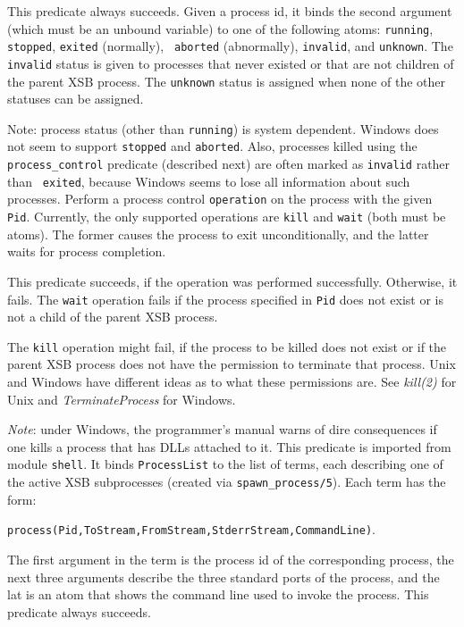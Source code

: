 \begin{description}
    This predicate always succeeds. Given a process id, it binds the second
    argument (which must be an unbound variable) to one of the following
    atoms: {\tt running}, {\tt stopped}, {\tt exited} (normally), {\tt
      aborted} (abnormally), {\tt invalid}, and {\tt unknown}.
    The {\tt invalid} status is given to processes that never existed or
    that are not children of the parent XSB process. The {\tt unknown}
    status is assigned when none of the other statuses can be assigned.

    Note: process status (other than {\tt running}) is system dependent.
    Windows does not seem to support {\tt stopped} and {\tt aborted}.
    Also, processes killed using the \verb|process_control| predicate
    (described next) are often marked as {\tt invalid} rather than {\tt
    exited}, because Windows seems to lose all information about such
    processes.
    Perform a process control {\tt operation} on the process with the given
    {\tt Pid}. 
    Currently, the only supported operations are {\tt kill} and {\tt wait}
    (both must be atoms).
    The former causes the process to exit unconditionally, and the latter
    waits for process completion.

    This predicate succeeds, if the operation was performed successfully.
    Otherwise, it fails. The {\tt wait} operation fails if the process
    specified in {\tt Pid} does not exist or is not a child of the parent
    XSB process. 
    
    The {\tt kill} operation might fail, if the process to be killed does
    not exist or if the parent XSB process does not have the permission to
    terminate that process. Unix and Windows have different ideas as to
    what these permissions are. See \emph{kill(2)} for Unix and
    \emph{TerminateProcess} for Windows.
    
    \emph{Note}: under Windows, the programmer's manual warns of dire
    consequences if one kills a process that has DLLs attached to it.
    This predicate is imported from module {\tt shell}.
    It binds {\tt ProcessList} to the list of terms, each describing one of
    the active XSB subprocesses (created via \verb|spawn_process/5|).
    Each term has the form:
    \begin{center}
      \verb|process(Pid,ToStream,FromStream,StderrStream,CommandLine)|. 
    \end{center}
    The first argument in the term is the process id of the corresponding
    process, the next three arguments describe the three standard ports
    of the process, and the lat is an atom that shows the command line used
    to invoke the process.
    This predicate always succeeds.


\end{description}
